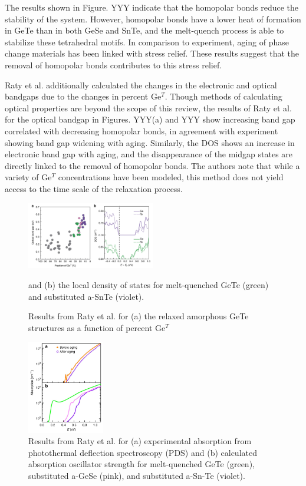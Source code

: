 \documentclass[3p,review,12pt]{elsarticle}
\begin{document}
\par 
The results shown in Figure. YYY indicate that the homopolar bonds reduce the stability of the system. However, homopolar bonds have a lower heat of formation in GeTe than in both GeSe and SnTe, and the melt-quench process is able to stabilize these tetrahedral motifs. In comparison to experiment, aging of phase change materials has been linked with stress relief. These results suggest that the removal of homopolar bonds contributes to this stress relief.
\par 
Raty et al. additionally calculated the changes in the electronic and optical bandgaps due to the changes in percent Ge$^{T}$. Though methods of calculating optical properties are beyond the scope of this review, the results of Raty et al. for the optical bandgap in Figures. YYY(a) and YYY show increasing band gap correlated with decreasing homopolar bonds, in agreement with experiment showing band gap widening with aging. Similarly, the DOS shows an increase in electronic band gap with aging, and the disappearance of the midgap states are directly linked to the removal of homopolar bonds. The authors note that while a variety of Ge$^T$ concentrations have been modeled, this method does not yield access to the time scale of the relaxation process. 
\begin{figure}[h]
	\includegraphics[width=0.5\textwidth]{raty2}
	\centering
	\caption{Results from Raty et al. \cite{Raty2015} for (a) the relaxed amorphous GeTe structures as a function of percent Ge$^{T}$} and (b) the local density of states for melt-quenched GeTe (green) and substituted a-SnTe (violet).
\end{figure}
\begin{figure}[h]
	\includegraphics[width=0.3\textwidth]{raty3}
	\centering
	\caption{Results from Raty et al. \cite{Raty2015} for (a) experimental absorption from photothermal deflection spectroscopy (PDS) and (b) calculated absorption oscillator strength for melt-quenched GeTe (green), substituted a-GeSe (pink), and substituted a-Sn-Te (violet). } 
\end{figure}
\end{document}
